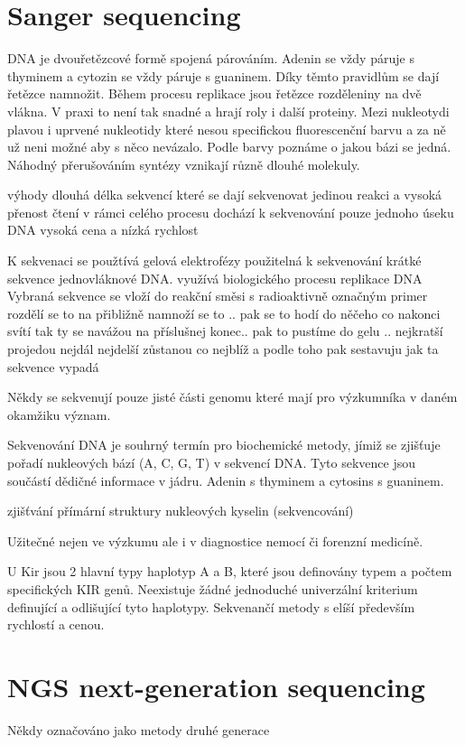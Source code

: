 \documentclass[czech,DP]{thesiskiv}
\begin{document}
\section{Sanger sequencing}
DNA je dvouřetězcové formě spojená párováním. Adenin se vždy páruje s thyminem a cytozin se vždy páruje s guaninem. Díky těmto pravidlům se dají řetězce namnožit. 
Během procesu replikace jsou řetězce rozděleniny na dvě vlákna. 
V praxi to není tak snadné a hrají roly i další proteiny. 
Mezi nukleotydi plavou i uprvené nukleotidy které nesou specifickou fluorescenční barvu a za ně už neni možné aby s něco nevázalo.  Podle barvy poznáme o jakou bázi se jedná. 
Náhodný přerušováním syntézy vznikají různě dlouhé molekuly. 

výhody dlouhá délka sekvencí které se dají sekvenovat jedinou reakci a vysoká přenost čtení
v rámci celého procesu dochází k sekvenování pouze jednoho úseku DNA 
vysoká cena a nízká rychlost


 K sekvenaci se použtívá gelová elektrofézy
 použitelná k sekvenování krátké sekvence jednovláknové DNA. 
 využívá biologického procesu replikace DNA
 Vybraná sekvence se vloží do reakční směsi s radioaktivně označným primer
 rozdělí se to na přibližně 
 namnoží se to .. 
 pak se to hodí do něčeho co nakonci svítí tak ty se navážou na příslušnej konec.. 
 pak to pustíme do gelu .. 
 nejkratší projedou nejdál
 nejdelší zůstanou co nejblíž a podle toho pak sestavuju jak ta sekvence vypadá




Někdy se sekvenují pouze jisté části genomu které mají pro výzkumníka v daném okamžiku význam.

Sekvenování DNA je souhrný termín pro biochemické metody, jímiž se zjišťuje pořadí nukleových bází (A, C, G, T) v sekvencí DNA. Tyto sekvence jsou součástí dědičné informace v jádru.
Adenin s thyminem a cytosins s guaninem.

zjišťvání přímární struktury nukleových kyselin (sekvencování)

Užitečné nejen ve výzkumu ale i v diagnostice nemocí či forenzní medicíně. 


U Kir jsou 2 hlavní typy haplotyp A a B, které jsou definovány typem a počtem specifických KIR genů. Neexistuje žádné jednoduché univerzální kriterium definující a odlišující tyto haplotypy. 
Sekvenančí metody s elíší především rychlostí a cenou.

 
 
\section{NGS next-generation sequencing}
Někdy označováno jako metody druhé generace
 
\end{document}
